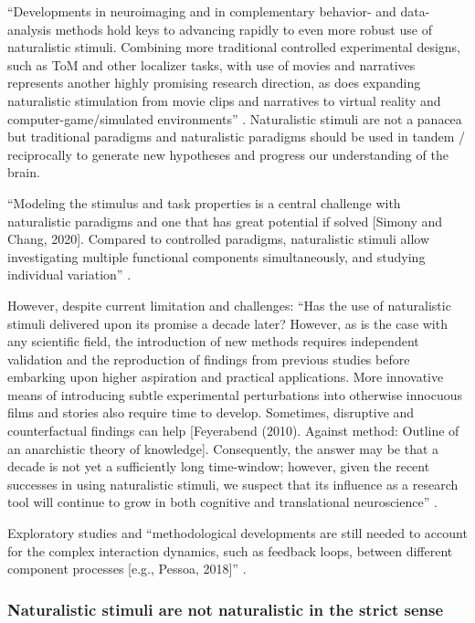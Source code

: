 %
``Developments in neuroimaging and in complementary behavior- and
data-analysis methods hold keys to advancing rapidly to even more robust use of
naturalistic stimuli.
%
Combining more traditional controlled experimental designs, such as ToM and
other localizer tasks, with use of movies and narratives represents another
highly promising research direction, as does expanding naturalistic stimulation
from movie clips and narratives to virtual reality and computer-game/simulated
environments'' \citep{jaaskelainen2021movies}.
%
Naturalistic stimuli are not a panacea but traditional paradigms and
naturalistic paradigms should be used in tandem / reciprocally to generate new
hypotheses and progress our understanding of the brain.

%
``Modeling the stimulus and task properties is a central challenge with
naturalistic paradigms and one that has great potential if solved [Simony and
Chang, 2020].
%
Compared to controlled paradigms, naturalistic stimuli allow investigating
multiple functional components simultaneously, and studying individual
variation'' \citep{saarimaki2021naturalistic}.

However, despite current limitation and challenges:
%
``Has the use of naturalistic stimuli delivered upon its promise a decade later?
%
However, as is the case with any scientific field, the introduction of new
methods requires independent validation and the reproduction of findings from
previous studies before embarking upon higher aspiration and practical
applications.
%
More innovative means of introducing subtle experimental perturbations into
otherwise innocuous films and stories also require time to develop.
%
Sometimes, disruptive and counterfactual findings can help [Feyerabend (2010).
Against method: Outline of an anarchistic theory of knowledge].
%
Consequently, the answer may be that a decade is not yet a sufficiently long
time-window;
%
however, given the recent successes in using naturalistic stimuli, we suspect
that its influence as a research tool will continue to grow in both cognitive
and translational neuroscience'' \citep{sonkusare2019naturalistic}.

%
Exploratory studies and ``methodological developments are still needed to
account for the complex interaction dynamics, such as feedback loops, between
different component processes [e.g., Pessoa, 2018]''
\citep{saarimaki2021naturalistic}.


\subsubsection{Naturalistic stimuli are not naturalistic in the strict sense}


